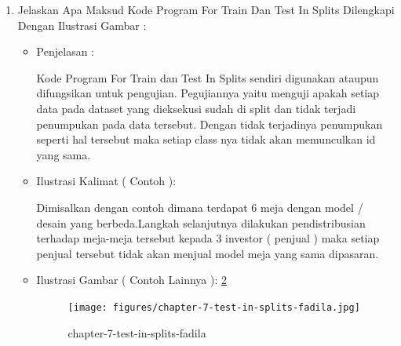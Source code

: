 \begin{enumerate}
\begin{itemize}
\par
\item Ilustrasi Gambar ( Contoh ): \ref{chapter-7-starfied-k-fold-cross-fadila}
\par
\par
\begin{figure}[!hbtp]
\centering
\texttt{[image: figures/chapter-7-starfied-k-fold-cross-fadila.jpg]}
\caption{Startified K-Fold Cross - fadila}
\label{chapter-7-starfied-k-fold-cross-fadila}
\end{figure}
\par
\par
\end{itemize}
\par
\par
\par
\item Jelaskan Apa Maksud Kode Program For Train Dan Test In Splits Dilengkapi Dengan Ilustrasi Gambar :
\begin{itemize}
\item Penjelasan	:
\par Kode Program For Train dan Test In Splits sendiri digunakan ataupun difungsikan untuk pengujian. Pegujiannya yaitu menguji apakah setiap data pada dataset yang dieksekusi sudah di split dan tidak terjadi penumpukan pada data tersebut. Dengan tidak terjadinya penumpukan seperti hal tersebut maka setiap class nya tidak akan memunculkan id yang sama.
\par 
\par
\par
\item Ilustrasi Kalimat ( Contoh ):
\par Dimisalkan dengan contoh dimana terdapat 6 meja dengan model / desain yang berbeda.Langkah selanjutnya dilakukan pendistribusian terhadap meja-meja tersebut kepada 3 investor ( penjual ) maka setiap penjual tersebut tidak akan menjual model meja yang sama dipasaran.
\par
\item Ilustrasi Gambar ( Contoh Lainnya ): \ref{chapter-7-test-in-splits-fadila}
\par
\begin{figure}[!hbtp]
\centering
\texttt{[image: figures/chapter-7-test-in-splits-fadila.jpg]}
\caption{chapter-7-test-in-splits-fadila}
\label{chapter-7-test-in-splits-fadila}
\end{figure}
\par
\par
\end{itemize}

\end{enumerate}
